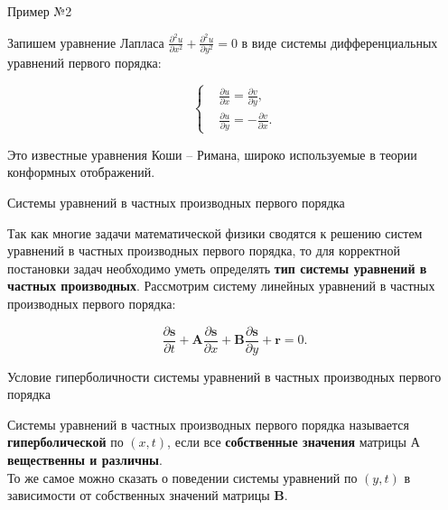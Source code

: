 \documentclass[10pt,xcolor=pst,aspectratio=169]{beamer}
\begin{document}
\begin{frame}{Пример №2}

    \transdissolve[duration=0.1]
    \justifying
    \large

    Запишем уравнение Лапласа $\frac{\partial^{2} u}{\partial x^{2}} + \frac{\partial^{2} u}{\partial y^{2}} = 0$ в виде системы дифференциальных уравнений первого порядка:

    \[
        \begin{cases}
            &\frac{\partial u}{\partial x} = \frac{\partial v}{\partial y},\\
            &\frac{\partial u}{\partial y} = -\frac{\partial v}{\partial x}.
        \end{cases}
    \]

    Это известные уравнения Коши -- Римана, широко используемые в теории конформных отображений.

\end{frame}

\begin{frame}{Системы уравнений в частных производных первого порядка}

    \transdissolve[duration=0.1]
    \justifying
    \large

    Так как многие задачи математической физики сводятся к решению систем уравнений в частных производных первого порядка, то для корректной постановки задач необходимо уметь определять \textbf{тип системы уравнений в частных производных}. Рассмотрим систему линейных уравнений в частных производных первого порядка:

    \[
        \frac{\partial \mathbf{s}}{\partial t} + \mathbf{A} \frac{\partial \mathbf{s}}{\partial x} + \mathbf{B} \frac{\partial \mathbf{s}}{\partial y} + \mathbf{r} = 0.
    \]

\end{frame}

\begin{frame}{Условие гиперболичности системы уравнений в частных производных первого порядка}

    \transdissolve[duration=0.1]
    \justifying
    \large

    Системы уравнений в частных производных первого порядка называется \textbf{гиперболической} по $(x,t)$, если все \textbf{собственные значения} матрицы $\mathbf{А}$ \textbf{вещественны и различны}.\\

    То же самое можно сказать о поведении системы уравнений по $(y,t)$ в зависимости от собственных значений матрицы $\mathbf{B}$.

\end{frame}
\end{document}
